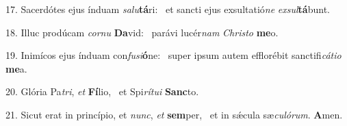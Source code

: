 17. Sacerdótes ejus índuam \textit{sa}\textit{lu}\textbf{tá}ri: \ast\  et sancti ejus exsultatió\textit{ne} \textit{ex}\textit{sul}\textbf{tá}bunt.\

18. Illuc prodúcam \textit{cor}\textit{nu} \textbf{Da}vid: \ast\  parávi lucér\textit{nam} \textit{Chris}\textit{to} \textbf{me}o.\

19. Inimícos ejus índuam con\textit{fu}\textit{si}\textbf{ó}ne: \ast\  super ipsum autem efflorébit sanctifi\textit{cá}\textit{ti}\textit{o} \textbf{me}a.\

20. Glória Pa\textit{tri}, \textit{et} \textbf{Fí}lio, \ast\  et Spi\textit{rí}\textit{tu}\textit{i} \textbf{Sanc}to.\

21. Sicut erat in princípio, et \textit{nunc}, \textit{et} \textbf{sem}per, \ast\  et in sǽcula sæ\textit{cu}\textit{ló}\textit{rum}. \textbf{A}men.\

